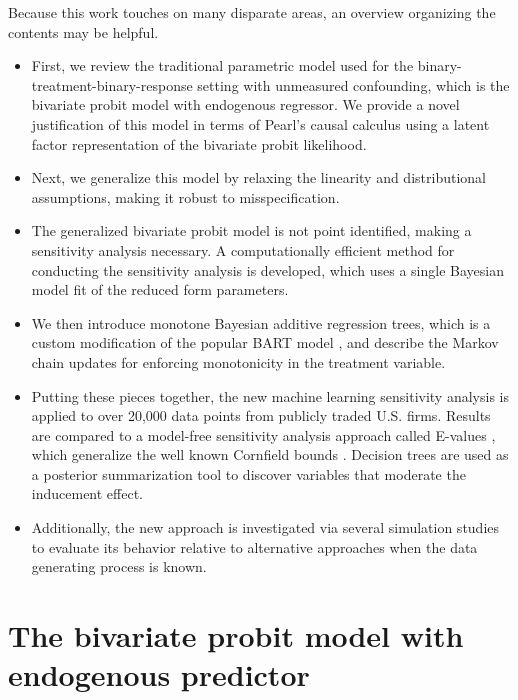 \documentclass[aoas,preprint, 11pt, dvipsnames, table, x11name]{imsart}
\theoremstyle{remark}
\begin{document}
	Because this work touches on many disparate areas, an overview organizing the contents may be helpful.
	\begin{itemize}
		\item First, we review the traditional parametric model used for the binary-treatment-binary-response setting with unmeasured confounding, which is the bivariate probit model with endogenous regressor. We provide a novel justification of this model in terms of Pearl's causal calculus using a latent factor representation of the bivariate probit likelihood. 
		\item Next, we generalize this model by relaxing the linearity and distributional assumptions, making it robust to misspecification.
		\item The generalized bivariate probit model is not point identified, making a sensitivity analysis necessary. A computationally efficient method for conducting the sensitivity analysis is developed, which uses a single Bayesian model fit of the reduced form parameters.
		\item We then introduce monotone Bayesian additive regression trees, which is a custom modification of the popular BART model \citep{bart}, and describe the Markov chain updates for enforcing monotonicity in the treatment variable.
		\item Putting these pieces together, the new machine learning sensitivity analysis is applied to over 20,000 data points from publicly traded U.S. firms. Results are compared to a model-free sensitivity analysis approach called E-values \citep{Peng-2016}, which generalize the well known Cornfield bounds \citep{Cornfield}. Decision trees are used as a posterior summarization tool to discover variables that moderate the inducement effect.  
		\item Additionally, the new approach is investigated via several simulation studies to evaluate its behavior relative to alternative approaches when the data generating process is known.
	\end{itemize}
	
	\section{The bivariate probit model with endogenous predictor}
	
\end{document}
